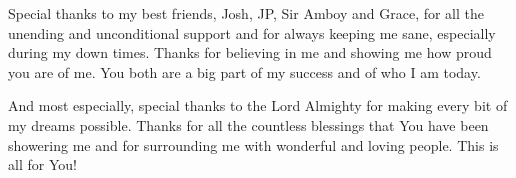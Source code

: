 \documentclass[a4paper, twoside]{report}
\begin{document}
Special thanks to my best friends, Josh, JP, Sir Amboy and Grace, for all the unending and unconditional support and for always keeping me sane, especially during my down times. Thanks for believing in me and showing me how proud you are of me. You both are a big part of my success and of who I am today.

And most especially, special thanks to the Lord Almighty for making every bit of my dreams possible. Thanks for all the countless blessings that You have been showering me and for surrounding me with wonderful and loving people. This is all for You!






\tableofcontents %
\listoffigures %
\listoftables %








%
%
%


\clearpage
\printglossary[type=\acronymtype]




\end{document}
